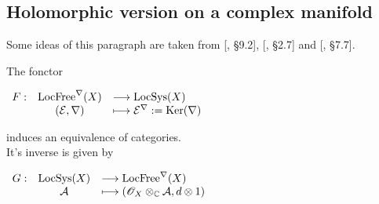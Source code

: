 \subsection{Holomorphic version on a complex manifold} \label{Holomorphic version on a complex manifold}

Some ideas of this paragraph are taken from [\cite{voisin_hodge}, §9.2], [\cite{szamuely_galois}, §2.7] and [\cite{poonen}, §7.7].

\begin{mytheo}
The fonctor
\begin{center}
$\displaystyle \begin{array}{rcll} F : & \text{LocFree}^\nabla(X) & \longrightarrow \text{LocSys}(X) \\ & (\mathcal{E},\nabla) & \longmapsto \mathcal{E}^{\nabla} := \text{Ker}(\nabla) \end{array}$
\end{center}
induces an equivalence of categories.\\
It's inverse is given by
\begin{center}
$\displaystyle \begin{array}{rcll} G : & \text{LocSys}(X) & \longrightarrow \text{LocFree}^\nabla(X) \\ & \mathcal{A} & \longmapsto (\mathscr{O}_X \otimes_{\mathbb{C}} \mathcal{A},d\otimes 1) \end{array}$
\end{center}
\end{mytheo}


